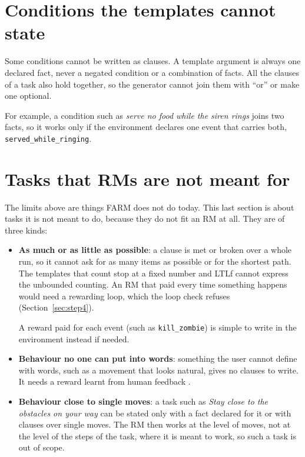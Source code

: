 \documentclass[11pt,english,listoffigures,listoftables]{tfgetsinf}
\begin{document}
\section{Conditions the templates cannot state}
\label{sec:lim-conditions}
Some conditions cannot be written as clauses. A template argument is always one declared fact, never a negated condition or a combination of facts. All the clauses of a task also hold together, so the generator cannot join them with ``or'' or make one optional.

For example, a condition such as \textit{serve no food while the siren rings} joins two facts, so it works only if the environment declares one event that carries both, \texttt{served\_\allowbreak while\_\allowbreak ringing}.

\section{Tasks that RMs are not meant for}
\label{sec:lim-quantities}
The limits above are things FARM does not do today. This last section is about tasks it is not meant to do, because they do not fit an RM at all. They are of three kinds:
\begin{itemize}
    \item \textbf{As much or as little as possible}: a clause is met or broken over a whole run, so it cannot ask for as many items as possible or for the shortest path. The templates that count stop at a fixed number and LTLf cannot express the unbounded counting. An RM that paid every time something happens would need a rewarding loop, which the loop check refuses (Section~\ref{sec:step4}). 
    
    A reward paid for each event (such as \texttt{kill\_zombie}) is simple to write in the environment instead if needed.
    \item \textbf{Behaviour no one can put into words}: something the user cannot define with words, such as a movement that looks natural, gives no clauses to write. It needs a reward learnt from human feedback \cite{christiano2017deep}.
    \item \textbf{Behaviour close to single moves}: a task such as \textit{Stay close to the obstacles on your way} can be stated only with a fact declared for it or with clauses over single moves. The RM then works at the level of moves, not at the level of the steps of the task, where it is meant to work, so such a task is out of scope.
\end{itemize}
\end{document}
